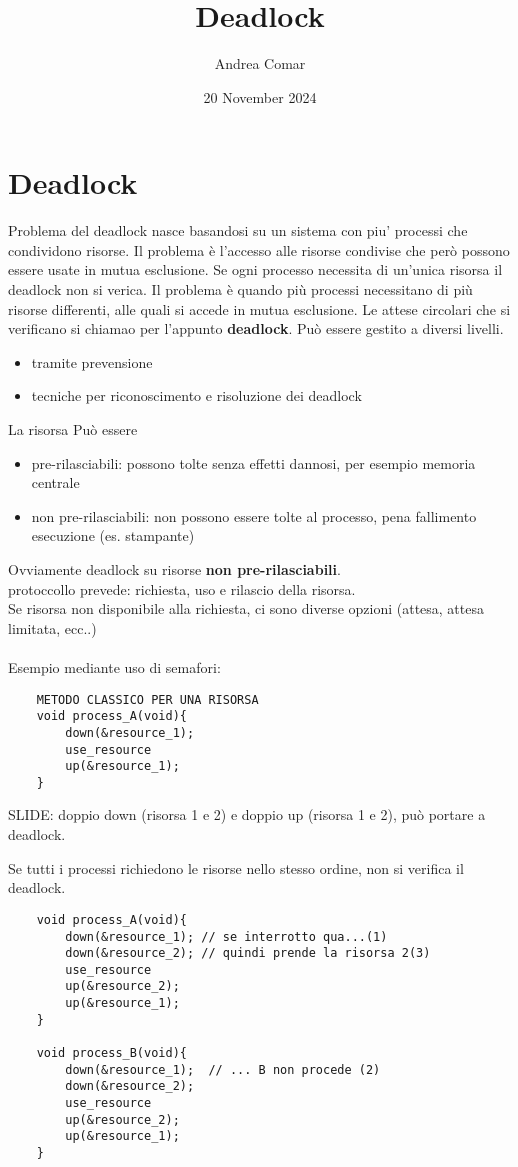 \documentclass{article}
\title{Deadlock}
\author{Andrea Comar}
\date{20 November 2024}
\begin{document}
\maketitle
\section{Deadlock}
Problema del deadlock nasce basandosi su un sistema con piu' processi che condividono risorse.
Il problema è l'accesso alle risorse condivise che però possono essere usate in mutua esclusione.
Se ogni processo necessita di un'unica risorsa il deadlock non si verica. Il problema è quando più processi
necessitano di più risorse differenti, alle quali si accede in mutua esclusione.
Le attese circolari che si verificano si chiamao per l'appunto \textbf{deadlock}.
Può essere gestito a diversi livelli.
\begin{itemize}
    \item tramite prevensione
    \item tecniche per riconoscimento e risoluzione dei deadlock
\end{itemize}

La risorsa Può essere
\begin{itemize}
    \item pre-rilasciabili: possono tolte senza effetti dannosi, per esempio memoria centrale
    \item non pre-rilasciabili: non possono essere tolte al processo, pena fallimento esecuzione (es. stampante)
\end{itemize}

Ovviamente deadlock su risorse \textbf{non pre-rilasciabili}.\\
protoccollo prevede: richiesta, uso e rilascio della risorsa.\\
Se risorsa non disponibile alla richiesta, ci sono diverse opzioni (attesa, attesa limitata, ecc..)\\
\\
Esempio mediante uso di semafori:

\begin{lstlisting}
    METODO CLASSICO PER UNA RISORSA
    void process_A(void){
        down(&resource_1);
        use_resource
        up(&resource_1);
    }
\end{lstlisting}

SLIDE: doppio down (risorsa 1 e 2) e doppio up (risorsa 1 e 2), può portare a deadlock.

Se tutti i processi richiedono le risorse nello stesso ordine, non si verifica il deadlock.
\begin{lstlisting}
    void process_A(void){
        down(&resource_1); // se interrotto qua...(1)
        down(&resource_2); // quindi prende la risorsa 2(3)
        use_resource
        up(&resource_2);
        up(&resource_1);
    }
    
    void process_B(void){
        down(&resource_1);  // ... B non procede (2)
        down(&resource_2); 
        use_resource
        up(&resource_2);
        up(&resource_1);
    }
\end{lstlisting}
\end{document}
